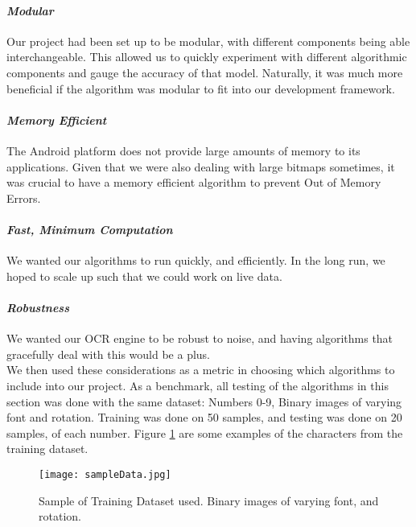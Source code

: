 \paragraph{\textit{Modular}} Our project had been set up to be modular, with different components being able interchangeable. This allowed us
to quickly experiment with different algorithmic components and gauge the accuracy of that model. Naturally, it was much more beneficial if
the algorithm was modular to fit into our development framework.

\paragraph{\textit{Memory Efficient}} The Android platform does not provide large amounts of memory to its applications. Given that we were
also dealing with large bitmaps sometimes, it was crucial to have a memory efficient algorithm to prevent Out of Memory Errors.

\paragraph{\textit{Fast, Minimum Computation}} We wanted our algorithms to run quickly, and efficiently. In the long run, we hoped to scale
up such that we could work on live data.
\paragraph{\textit{Robustness}} We wanted our OCR engine to be robust to noise, and having algorithms that gracefully deal with this would
be a plus.\\

We then used these considerations as a metric in choosing which algorithms to include into our project. As a benchmark, all testing
of the algorithms in this section was done with the same dataset: Numbers 0-9, Binary images of varying font and rotation. Training
was done on 50 samples, and testing was done on 20 samples, of each number. Figure \ref{fig:sampleData} are some examples of the characters from the training dataset.\\
\begin{figure}[h]
		\texttt{[image: sampleData.jpg]}\\
		\caption{Sample of Training Dataset used. Binary images of varying font, and rotation.}
		\label{fig:sampleData}
\end{figure}





